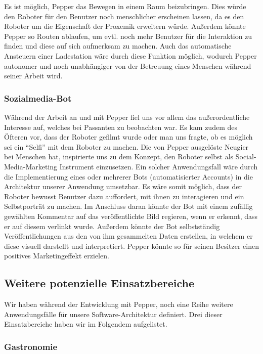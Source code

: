 Es ist möglich, Pepper das Bewegen in einem Raum beizubringen. Dies würde den Roboter für den Benutzer noch menschlicher erscheinen lassen, da es den Roboter um die Eigenschaft der Proxemik erweitern würde. Außerdem könnte Pepper so Routen ablaufen, um evtl. noch mehr Benutzer für die Interaktion zu finden und diese auf sich aufmerksam zu machen. Auch das automatische Ansteuern einer Ladestation wäre durch diese Funktion möglich, wodurch Pepper autonomer und noch unabhängiger von der Betreuung eines Menschen während seiner Arbeit wird.\\

\subsubsection{Sozialmedia-Bot}
\label{sec:Sozialmedia-Bot}
Während der Arbeit an und mit Pepper fiel uns vor allem das außerordentliche Interesse auf, welches bei Passanten zu beobachten war. Es kam zudem des Öfteren vor, dass der Roboter gefilmt wurde oder man uns fragte, ob es möglich sei ein “Selfi” mit dem Roboter zu machen. Die von Pepper ausgelöste Neugier bei Menschen hat, inspirierte uns zu dem Konzept, den Roboter selbst als Social-Media-Marketing Instrument einzusetzen.
Ein solcher Anwendungsfall wäre durch die Implementierung eines oder mehrerer Bots (automatisierter Accounts) in die Architektur unserer Anwendung umsetzbar. Es wäre somit möglich, dass der Roboter bewusst Benutzer dazu auffordert, mit ihnen zu interagieren und ein Selbstporträt zu machen. Im Anschluss daran könnte der Bot mit einem zufällig gewählten Kommentar auf das veröffentlichte Bild regieren, wenn er erkennt, dass er auf diesem verlinkt wurde. Außerdem könnte der Bot selbstständig Veröffentlichungen aus den von ihm gesammelten Daten erstellen, in welchem er diese visuell darstellt und interpretiert. Pepper könnte so für seinen Besitzer einen positives Marketingeffekt erzielen.\\

\subsection{Weitere potenzielle Einsatzbereiche}

Wir haben während der Entwicklung mit Pepper, noch eine Reihe weitere Anwendungsfälle für unsere Software-Architektur definiert. Drei dieser Einsatzbereiche haben wir im Folgendem aufgelistet.\\

\subsubsection{Gastronomie}

